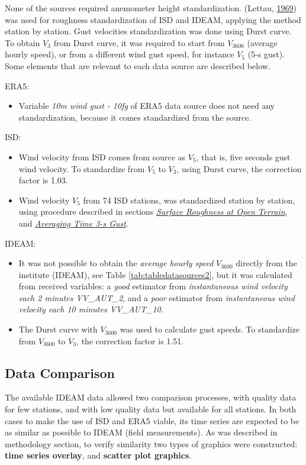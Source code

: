\documentclass[12pt,twoside]{reedthesis}
\providecommand{\tightlist}{%
  \setlength{\itemsep}{0pt}\setlength{\parskip}{0pt}}
\begin{document}
None of the sources required anemometer height standardization. (Lettau, \protect\hyperlink{ref-Lettau1969}{1969}) was used for roughness standardization of ISD and IDEAM, applying the method station by station. Gust velocities standardization was done using Durst curve. To obtain \(V_3\) from Durst curve, it was required to start from \(V_{3600}\) (average hourly speed), or from a different wind gust speed, for instance \(V_5\) (5-s gust). Some elements that are relevant to each data source are described below.

ERA5:
\begin{itemize}
\tightlist
\item
  Variable \emph{10m wind gust - 10fg} of ERA5 data source does not need any standardization, because it comes standardized from the source.
\end{itemize}
ISD:
\begin{itemize}
\item
  Wind velocity from ISD comes from source as \(V_5\), that is, five seconds gust wind velocity. To standardize from \(V_5\) to \(V_3\), using Durst curve, the correction factor is 1.03.
\item
  Wind velocity \(V_5\) from 74 ISD stations, was standardized station by station, using procedure described in sections \emph{\protect\hyperlink{rmd-roughness}{Surface Roughness at Open Terrain}}, and \emph{\protect\hyperlink{rmd-gust}{Averaging Time 3-s Gust}}.
\end{itemize}
IDEAM:
\begin{itemize}
\item
  It was not possible to obtain the \emph{average hourly speed} \(V_{3600}\) directly from the institute (IDEAM), see Table \ref{tab:tabledatasources2}, but it was calculated from received variables: a \emph{good} estimator from \emph{instantaneous wind velocity each 2 minutes VV\_AUT\_2}, and a \emph{poor} estimator from \emph{instantaneous wind velocity each 10 minutes VV\_AUT\_10}.
\item
  The Durst curve with \(V_{3600}\) was used to calculate gust speeds. To standardize from \(V_{3600}\) to \(V_3\), the correction factor is 1.51.
\end{itemize}
\hypertarget{data-comparison}{%
\subsection{Data Comparison}\label{data-comparison}}

The available IDEAM data allowed two comparison processes, with quality data for few stations, and with low quality data but available for all stations. In both cases to make the use of ISD and ERA5 viable, its time series are expected to be as similar as possible to IDEAM (field measurements). As was described in methodology section, to verify similarity two types of graphics were constructed: \textbf{time series overlay}, and \textbf{scatter plot graphics}.
\end{document}
